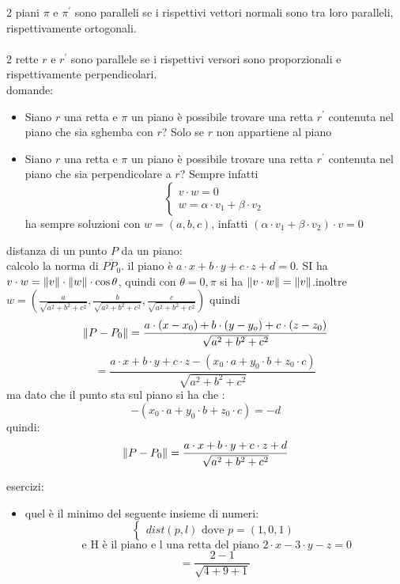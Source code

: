 \documentclass[a4paper,12pt, oneside]{book}
\begin{document}
2 piani $\pi$ e $\pi^{'}$ sono paralleli se i rispettivi vettori normali sono tra loro paralleli, rispettivamente ortogonali.\\
\\
2 rette $r$ e $r^{'}$ sono parallele se i rispettivi versori sono proporzionali e rispettivamente perpendicolari.\\
domande:
\begin{itemize}
\item Siano $r$ una retta  e $\pi$ un piano è possibile trovare una retta $r^{'}$ contenuta  nel piano che sia sghemba con $r$? Solo se $r$ non appartiene al piano

\item Siano $r$ una retta  e $\pi$ un piano è possibile trovare una retta $r^{'}$ contenuta  nel piano che sia perpendicolare a $r$? Sempre
infatti
$$\begin{cases}
v\cdot w=0\\
w=\alpha\cdot v_1+\beta\cdot v_2
\end{cases}
$$
ha sempre soluzioni con $w=(a,b,c)$, infatti $(\alpha\cdot v_1+\beta\cdot v_2)\cdot v=0$
\end{itemize}
distanza di un punto $P$ da un piano:\\
calcolo la norma di $\overline{PP_0}$. il piano è $a\cdot x+b\cdot y+c\cdot z+d=0$. SI ha $v\cdot w=\left\lVert {v} \right\rVert\cdot \left\lVert {w} \right\rVert\cdot \cos \theta$, quindi con $\theta =0,\pi$ si ha $\left\lVert {v\cdot w} \right\rVert=\left\lVert {v} \right\rVert$.inoltre $w=\left(\frac{a}{\sqrt{a^2+b^2+c^2}},\frac{b}{\sqrt{a^2+b^2+c^2}},\frac{c}{\sqrt{a^2+b^2+c^2}}\right)$
quindi $$
\left\lVert {P-P_0} \right\rVert=\frac{a\cdot (x-x_0)+b\cdot (y-y_o)+c\cdot (z-z_0)}{\sqrt{a^2+b^2+c^2}}$$
$$=\frac{a\cdot x+b\cdot y+c\cdot z-(x_0\cdot a+y_0\cdot b+z_0\cdot c)}{\sqrt{a^2+b^2+c^2}}$$
ma dato che il punto sta sul piano si ha che :
$$-(x_0\cdot a+y_0\cdot b+z_0\cdot c)=-d$$
quindi:
$$\left\lVert {P-P_0} \right\rVert=\frac{a\cdot x+b\cdot y+c\cdot z+d}{\sqrt{a^2+b^2+c^2}}$$
\begin{shaded}
esercizi:
\begin{itemize}
\item quel è il minimo del seguente insieme di numeri:
$$\begin{cases}
dist(p,l) \mbox{ dove } p=(1,0,1)\end{cases} $$$$\mbox{ e H è il piano e l una retta del piano } 2\cdot x -3\cdot y-z=0
$$
$$=\frac{2-1}{\sqrt{4+9+1}}$$
\end{itemize}
\end{shaded}
\end{document}
